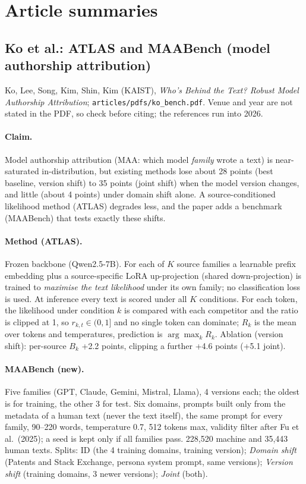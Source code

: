 \documentclass[10pt,a4paper,twocolumn]{article}
\begin{document}
\section{Article summaries}

\subsection{Ko et al.: ATLAS and MAABench (model authorship attribution)}
Ko, Lee, Song, Kim, Shin, Kim (KAIST), \emph{Who's Behind the Text? Robust Model Authorship Attribution}; \texttt{articles/pdfs/ko\_bench.pdf}. Venue and year are not stated in the PDF, so check before citing; the references run into 2026.

\paragraph{Claim.} Model authorship attribution (MAA: which model \emph{family} wrote a text) is near-saturated in-distribution, but existing methods lose about 28 points (best baseline, version shift) to 35 points (joint shift) when the model version changes, and little (about 4 points) under domain shift alone. A source-conditioned likelihood method (ATLAS) degrades less, and the paper adds a benchmark (MAABench) that tests exactly these shifts.

\paragraph{Method (ATLAS).} Frozen backbone (Qwen2.5-7B). For each of $K$ source families a learnable prefix embedding plus a source-specific LoRA up-projection (shared down-projection) is trained to \emph{maximise the text likelihood} under its own family; no classification loss is used. At inference every text is scored under all $K$ conditions. For each token, the likelihood under condition $k$ is compared with each competitor and the ratio is clipped at 1, so $r_{k,t}\in(0,1]$ and no single token can dominate; $R_k$ is the mean over tokens and temperatures, prediction is $\arg\max_k R_k$. Ablation (version shift): per-source $B_k$ +2.2 points, clipping a further +4.6 points (+5.1 joint).

\paragraph{MAABench (new).} Five families (GPT, Claude, Gemini, Mistral, Llama), 4 versions each; the oldest is for training, the other 3 for test. Six domains, prompts built only from the metadata of a human text (never the text itself), the same prompt for every family, 90--220 words, temperature 0.7, 512 tokens max, validity filter after Fu et al.\ (2025); a seed is kept only if all families pass. 228,520 machine and 35,443 human texts. Splits: ID (the 4 training domains, training version); \emph{Domain shift} (Patents and Stack Exchange, persona system prompt, same versions); \emph{Version shift} (training domains, 3 newer versions); \emph{Joint} (both).
\end{document}
